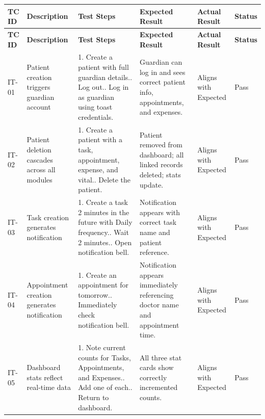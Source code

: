 \documentclass[12pt,a4paper]{article}
\begin{document}
\begin{longtable}{|p{1cm}|p{2.5cm}|p{3.5cm}|p{3.5cm}|p{2cm}|p{1.2cm}|}
    \hline
    \textbf{TC ID} & \textbf{Description} & \textbf{Test Steps} & \textbf{Expected Result} & \textbf{Actual Result} & \textbf{Status} \\
    \hline
    \endfirsthead
    \hline
    \textbf{TC ID} & \textbf{Description} & \textbf{Test Steps} & \textbf{Expected Result} & \textbf{Actual Result} & \textbf{Status} \\
    \hline
    \endhead
 
    IT-01 & Patient creation triggers guardian account &
        1. Create a patient with full guardian details.\newline
        2. Log out.\newline
        3. Log in as guardian using toast credentials. &
        Guardian can log in and sees correct patient info, appointments, and expenses. &
        Aligns with Expected & Pass \\
    \hline
 
    IT-02 & Patient deletion cascades across all modules &
        1. Create a patient with a task, appointment, expense, and vital.\newline
        2. Delete the patient. &
        Patient removed from dashboard; all linked records deleted; stats update. &
        Aligns with Expected & Pass \\
    \hline
 
    IT-03 & Task creation generates notification &
        1. Create a task 2 minutes in the future with Daily frequency.\newline
        2. Wait 2 minutes.\newline
        3. Open notification bell. &
        Notification appears with correct task name and patient reference. &
        Aligns with Expected & Pass \\
    \hline
 
    IT-04 & Appointment creation generates notification &
        1. Create an appointment for tomorrow.\newline
        2. Immediately check notification bell. &
        Notification appears immediately referencing doctor name and appointment time. &
        Aligns with Expected & Pass \\
    \hline
 
    IT-05 & Dashboard stats reflect real-time data &
        1. Note current counts for Tasks, Appointments, and Expenses.\newline
        2. Add one of each.\newline
        3. Return to dashboard. &
        All three stat cards show correctly incremented counts. &
        Aligns with Expected & Pass \\
    \hline
 

\end{longtable}
\end{document}
